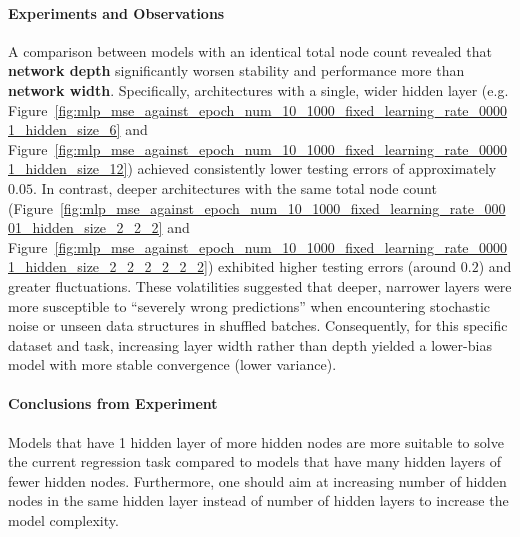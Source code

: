 \documentclass{article}
\begin{document}
\paragraph{Experiments and Observations}
A comparison between models with an identical total node count revealed that \textbf{network depth} significantly worsen stability and performance more than \textbf{network width}. Specifically, architectures with a single, wider hidden layer (e.g. Figure~\ref{fig:mlp_mse_against_epoch_num_10_1000_fixed_learning_rate_00001_hidden_size_6} and Figure~\ref{fig:mlp_mse_against_epoch_num_10_1000_fixed_learning_rate_00001_hidden_size_12}) achieved consistently lower testing errors of approximately $0.05$. In contrast, deeper architectures with the same total node count (Figure~\ref{fig:mlp_mse_against_epoch_num_10_1000_fixed_learning_rate_00001_hidden_size_2_2_2} and Figure~\ref{fig:mlp_mse_against_epoch_num_10_1000_fixed_learning_rate_00001_hidden_size_2_2_2_2_2_2}) exhibited higher testing errors (around $0.2$) and greater fluctuations. These volatilities suggested that deeper, narrower layers were more susceptible to ``severely wrong predictions'' when encountering stochastic noise or unseen data structures in shuffled batches. Consequently, for this specific dataset and task, increasing layer width rather than depth yielded a lower-bias model with more stable convergence (lower variance). 

\paragraph{Conclusions from Experiment}
Models that have 1 hidden layer of more hidden nodes are more suitable to solve the current regression task compared to models that have many hidden layers of fewer hidden nodes. Furthermore, one should aim at increasing number of hidden nodes in the same hidden layer instead of number of hidden layers to increase the model complexity. 


\end{document}

